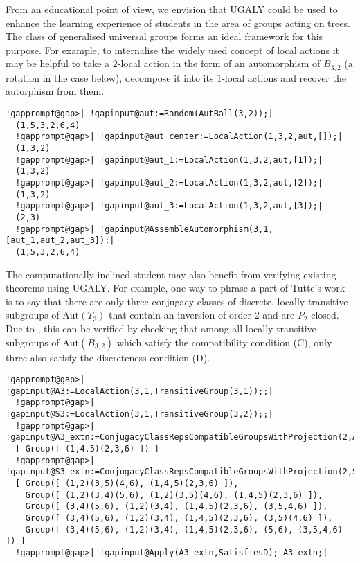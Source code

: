 \documentclass[a4paper,11pt]{report}
\begin{document}
{{ From an educational point of view, we envision that \textsf{UGALY} could be used to enhance the learning experience of students in the area of
groups acting on trees. The class of generalised universal groups forms an
ideal framework for this purpose. For example, to internalise the widely used
concept of local actions it may be helpful to take a $2$-local action in the form of an automorphism of $B_{3,2}$ (a rotation in the case below), decompose it into its $1$-local actions and recover the autorphism from them. 
\begin{Verbatim}[commandchars=!@|,fontsize=\small,frame=single,label=Example]
  !gapprompt@gap>| !gapinput@aut:=Random(AutBall(3,2));|
  (1,5,3,2,6,4)
  !gapprompt@gap>| !gapinput@aut_center:=LocalAction(1,3,2,aut,[]);|
  (1,3,2)
  !gapprompt@gap>| !gapinput@aut_1:=LocalAction(1,3,2,aut,[1]);|
  (1,3,2)
  !gapprompt@gap>| !gapinput@aut_2:=LocalAction(1,3,2,aut,[2]);|
  (1,3,2)
  !gapprompt@gap>| !gapinput@aut_3:=LocalAction(1,3,2,aut,[3]);|
  (2,3)
  !gapprompt@gap>| !gapinput@AssembleAutomorphism(3,1,[aut_1,aut_2,aut_3]);|
  (1,5,3,2,6,4)
\end{Verbatim}
 The computationally inclined student may also benefit from verifying existing
theorems using \textsf{UGALY}. For example, one way to phrase a part of Tutte's work \cite{Tut47} \cite{Tut59} is to say that there are only three conjugacy classes of discrete, locally
transitive subgroups of $\mathrm{Aut}(T_{3})$ that contain an inversion of order $2$ and are $P_{2}$-closed. Due to \cite[Corollary 4.38]{Tor20}, this can be verified by checking that among all locally transitive subgroups
of $\mathrm{Aut}(B_{3,2})$ which satisfy the compatibility condition (C), only three also satisfy the
discreteness condition (D). 
\begin{Verbatim}[commandchars=!@|,fontsize=\small,frame=single,label=Example]
  !gapprompt@gap>| !gapinput@A3:=LocalAction(3,1,TransitiveGroup(3,1));;|
  !gapprompt@gap>| !gapinput@S3:=LocalAction(3,1,TransitiveGroup(3,2));;|
  !gapprompt@gap>| !gapinput@A3_extn:=ConjugacyClassRepsCompatibleGroupsWithProjection(2,A3);|
  [ Group([ (1,4,5)(2,3,6) ]) ]
  !gapprompt@gap>| !gapinput@S3_extn:=ConjugacyClassRepsCompatibleGroupsWithProjection(2,S3);|
  [ Group([ (1,2)(3,5)(4,6), (1,4,5)(2,3,6) ]), 
    Group([ (1,2)(3,4)(5,6), (1,2)(3,5)(4,6), (1,4,5)(2,3,6) ]), 
    Group([ (3,4)(5,6), (1,2)(3,4), (1,4,5)(2,3,6), (3,5,4,6) ]), 
    Group([ (3,4)(5,6), (1,2)(3,4), (1,4,5)(2,3,6), (3,5)(4,6) ]), 
    Group([ (3,4)(5,6), (1,2)(3,4), (1,4,5)(2,3,6), (5,6), (3,5,4,6) ]) ]
  !gapprompt@gap>| !gapinput@Apply(A3_extn,SatisfiesD); A3_extn;|

\end{Verbatim}}}
\end{document}
